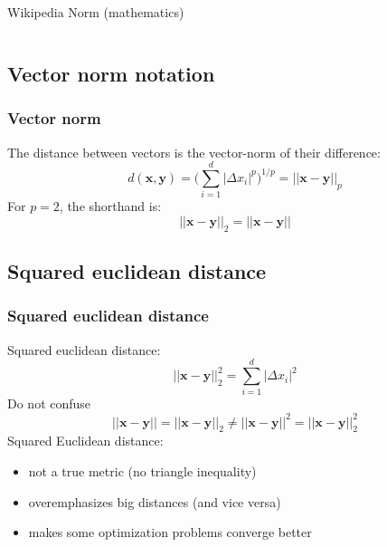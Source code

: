 \documentclass[Nike]{tuberlinbeamer}
\newcommand{\x}{\boldsymbol{x}}
\newcommand{\y}{\boldsymbol{y}}
\begin{document}
\begin{frame}[t]
\begin{columns}[T]
      \tiny Wikipedia Norm (mathematics)
  \end{columns}
\end{frame}

\subsection{Vector norm notation}
\begin{frame}
  \frametitle{Vector norm}
  The distance between vectors is the vector-norm of their difference:
  \begin{equation*}
    d(\x, \y) = \Bigg(\sum_{i=1}^d |\Delta x_i|^p\Bigg)^{1/p} = ||\x - \y||_p
  \end{equation*}
  \pause
  For $p=2$, the shorthand is:
  \begin{equation*}
    ||\x - \y||_2 = ||\x - \y||
  \end{equation*}
\end{frame}


\subsection{Squared euclidean distance}
\begin{frame}
  \frametitle{Squared euclidean distance}
  Squared euclidean distance:
  \begin{equation*}
    ||\x - \y||_2^2 = \sum_{i=1}^d |\Delta x_i|^2
  \end{equation*}
  \pause
  Do not confuse
  \begin{equation*}
    ||\x - \y|| = ||\x - \y||_2 \neq ||\x - \y||^2 = ||\x - \y||_2^2
  \end{equation*}
  \pause
  Squared Euclidean distance:
  \begin{itemize}
    \item not a true metric (no triangle inequality)
    \item overemphasizes big distances (and vice versa)
    \item makes some optimization problems converge better
  \end{itemize}
\end{frame}
\end{document}
